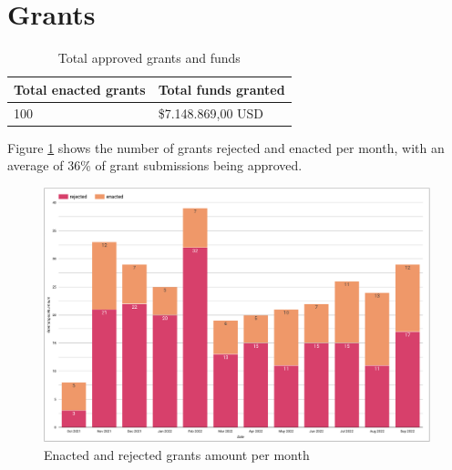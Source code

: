 \documentclass[MSE,Master,english]{twbook}%
\begin{document}
\section{Grants}
\begin{center}
  \begin{table}[H]
    \begin{tabular}{ | m{20em} | m{20em} | }
      \hline
      \textbf{Total enacted grants} & \textbf{Total funds granted} \\
      \hline
      100 & \$7.148.869,00 USD \\
      \hline
    \end{tabular}
    \caption{Total approved grants and funds}
    \label{table:grants_info}
  \end{table}
\end{center}

Figure \ref{fig:grants_amount} shows the number of grants rejected and enacted per month, with an average of 36\% of grant submissions being approved.
\begin{figure}[H]
  \centering
  \includegraphics[width=\textwidth]{metrics/grants_amount.png}
  \caption{Enacted and rejected grants amount per month}
  \label{fig:grants_amount}
\end{figure}
\end{document}

